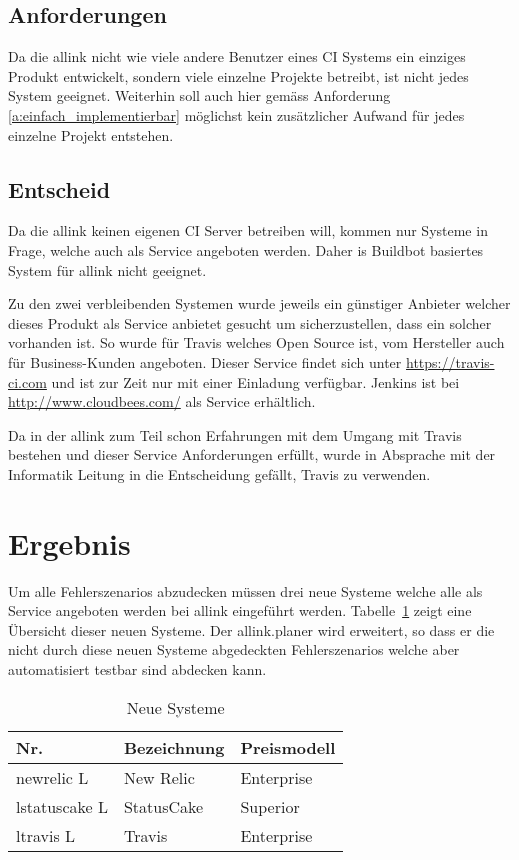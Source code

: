 \subsection{Anforderungen}
\label{sub:anforderungen}
Da die allink nicht wie viele andere Benutzer eines CI Systems ein einziges Produkt entwickelt, sondern viele einzelne Projekte betreibt, ist nicht jedes System geeignet. Weiterhin soll auch hier gemäss Anforderung \ref{a:einfach_implementierbar} möglichst kein zusätzlicher Aufwand für jedes einzelne Projekt entstehen.

\subsection{Entscheid}
\label{sub:entscheid_ci}
Da die allink keinen eigenen CI Server betreiben will, kommen nur Systeme in Frage, welche auch als Service angeboten werden. Daher is Buildbot basiertes System für allink nicht geeignet.

Zu den zwei verbleibenden Systemen wurde jeweils ein günstiger Anbieter welcher dieses Produkt als Service anbietet gesucht um sicherzustellen, dass ein solcher vorhanden ist. So wurde für Travis welches Open Source ist, vom Hersteller auch für Business-Kunden angeboten. Dieser Service findet sich unter \url{https://travis-ci.com} und ist zur Zeit nur mit einer Einladung verfügbar. Jenkins ist bei \url{http://www.cloudbees.com/} als Service erhältlich.
 
Da in der allink zum Teil schon Erfahrungen mit dem Umgang mit Travis bestehen und dieser Service Anforderungen erfüllt, wurde in Absprache mit der Informatik Leitung in die Entscheidung gefällt, Travis zu verwenden.

\section{Ergebnis}
\label{sec:ergebnis}
Um alle Fehlerszenarios abzudecken müssen drei neue Systeme welche alle als Service angeboten werden bei allink eingeführt werden. Tabelle~\ref{tab:neue_systeme} zeigt eine Übersicht dieser neuen Systeme. Der allink.planer wird erweitert, so dass er die nicht durch diese neuen Systeme abgedeckten Fehlerszenarios welche aber automatisiert testbar sind abdecken kann.

\makeatletter
{} \setcounter{lnumber}{0}
\renewcommand\thelnumber{L\arabic{lnumber}}
\newcommand{\newlnumber}[3]%
{%
\midrule%
\refstepcounter{lnumber}%
\expandafter\xdef\csname l#2\endcsname {#1}%
\thelnumber\label{l:#2} & #1 & #3 \\
}
\makeatother

\begin{table}[ht]
  \centering
  \begin{tabular}{l>{\raggedright} p{5cm} p{5cm}}
    \toprule \textbf{Nr.} & \textbf{Bezeichnung} & \textbf{Preismodell} \\
    \newlnumber{New Relic}{newrelic}{Enterprise}
    \newlnumber{StatusCake}{statuscake}{Superior}
    \newlnumber{Travis}{travis}{Enterprise}
    \bottomrule
  \end{tabular}
  \caption{Neue Systeme}
  \label{tab:neue_systeme}
\end{table}
